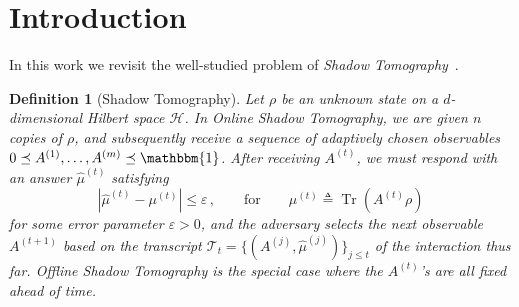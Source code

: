 \documentclass[10pt]{article}
\renewcommand{\epsilon}{\varepsilon}
\newcommand{\calH}{\mathcal{H}}
\DeclareMathOperator{\Tr}{Tr}
\newcommand{\Id}{\mathbbm{1}}
\newtheorem{definition}[theorem]{Definition}
\newcommand{\calT}{\mathcal{T}}
\begin{document}
\newpage

\tableofcontents

\newpage


\section{Introduction}

In this work we revisit the well-studied problem of \emph{Shadow Tomography}~\cite{Aar16,Aar20}.

\begin{definition}[Shadow Tomography]
    Let $\rho$ be an unknown state on a $d$-dimensional Hilbert space $\calH$. In \emph{Online Shadow Tomography}, we are given $n$ copies of $\rho$, and subsequently receive a sequence of adaptively chosen observables $0\preceq A^{(1)},\ldots,A^{(m)}\preceq \Id$. After receiving $A^{(t)}$, we must respond with an answer $\widehat{\mu}^{(t)}$ satisfying 
    \begin{equation}
        |\widehat{\mu}^{(t)} - \mu^{(t)}| \le \epsilon\,, \qquad \mathrm{for} \qquad \mu^{(t)} \triangleq \Tr(A^{(t)}\rho)
    \end{equation}
    for some error parameter $\epsilon > 0$, and the adversary selects the next observable $A^{(t+1)}$ based on the transcript $\calT_t=\{(A^{(j)},\widehat{\mu}^{(j)})\}_{j\le t}$ of the interaction thus far. \emph{Offline Shadow Tomography} is the special case where the $A^{(t)}$'s are all fixed ahead of time.
\end{definition}
\end{document}
